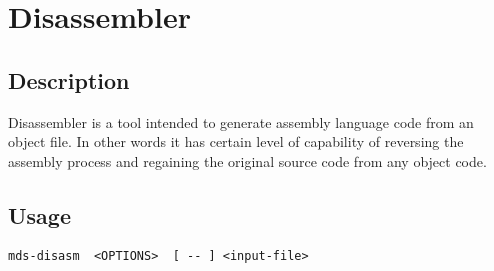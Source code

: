 \section{Disassembler}
    \subsection{Description}
        Disassembler is a tool intended to generate assembly language code from an object file. In other words it has certain level of capability of reversing the assembly process and regaining the original source code from any object code.

    \subsection{Usage}
        \verb'mds-disasm  <OPTIONS>  [ -- ] <input-file>'

